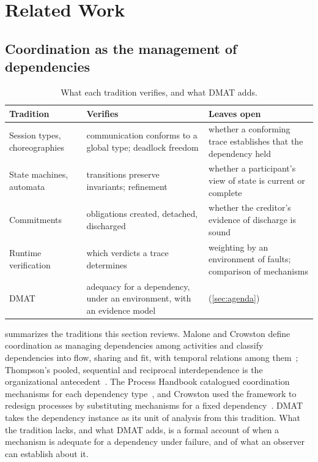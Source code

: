 \section{Related Work}
\label{sec:related}

\subsection{Coordination as the management of dependencies}
\begin{table}[t]
\centering
\caption{What each tradition verifies, and what DMAT adds.}
\label{tab:traditions}
\footnotesize
\setlength{\tabcolsep}{3pt}
\begin{tabular}{@{}p{18mm} p{30mm} p{34mm}@{}}
\toprule
Tradition & Verifies & Leaves open \\
\midrule
Session types, choreographies & communication conforms to a global type; deadlock freedom & whether a conforming trace establishes that the dependency held \\
State machines, automata & transitions preserve invariants; refinement & whether a participant's view of state is current or complete \\
Commitments & obligations created, detached, discharged & whether the creditor's evidence of discharge is sound \\
Runtime verification & which verdicts a trace determines & weighting by an environment of faults; comparison of mechanisms \\
DMAT & adequacy for a dependency, under an environment, with an evidence model & (\cref{sec:agenda}) \\
\bottomrule
\end{tabular}
\end{table}


 summarizes the traditions this section reviews. Malone and Crowston define coordination as managing dependencies among activities and classify dependencies into flow, sharing and fit, with temporal relations among them~\cite{malone1994interdisciplinary}; Thompson's pooled, sequential and reciprocal interdependence is the organizational antecedent~\cite{thompson1967organizations}. The Process Handbook catalogued coordination mechanisms for each dependency type~\cite{malone1999tools}, and Crowston used the framework to redesign processes by substituting mechanisms for a fixed dependency~\cite{crowston1997coordination}. DMAT takes the dependency instance as its unit of analysis from this tradition. What the tradition lacks, and what DMAT adds, is a formal account of when a mechanism is adequate for a dependency under failure, and of what an observer can establish about it.

